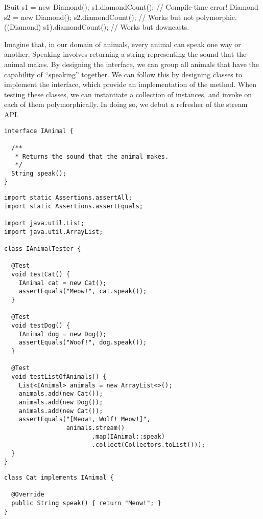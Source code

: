 \begin{verbnobox}[\small]
ISuit s1 = new Diamond();
s1.diamondCount();             // Compile-time error!
Diamond s2 = new Diamond();
s2.diamondCount();             // Works but not polymorphic.
((Diamond) s1).diamondCount(); // Works but downcasts.
\end{verbnobox}

Imagine that, in our domain of animals, every animal can speak one way or another. 
Speaking involves returning a string representing the sound that the animal makes. 
By designing the  interface, we can group all animals that have the capability of ``speaking'' together. 
We can follow this by designing classes to implement the  interface, which provide an implementation of the  method. 
When testing these classes, we can instantiate a collection of  instances, and invoke  on each of them polymorphically. 
In doing so, we debut a refresher of the stream API.

\begin{lstlisting}[language=MyJava]
interface IAnimal {

  /**
   * Returns the sound that the animal makes.
   */
  String speak();
}
\end{lstlisting}

\begin{lstlisting}[language=MyJava]
import static Assertions.assertAll;
import static Assertions.assertEquals;

import java.util.List;
import java.util.ArrayList;

class IAnimalTester {
  
  @Test
  void testCat() {
    IAnimal cat = new Cat();
    assertEquals("Meow!", cat.speak());
  }

  @Test
  void testDog() {
    IAnimal dog = new Dog();
    assertEquals("Woof!", dog.speak());
  }

  @Test
  void testListOfAnimals() {
    List<IAnimal> animals = new ArrayList<>();
    animals.add(new Cat());
    animals.add(new Dog());
    animals.add(new Cat());
    assertEquals("[Meow!, Wolf! Meow!]", 
                 animals.stream()
                        .map(IAnimal::speak)
                        .collect(Collectors.toList()));
  }
}
\end{lstlisting}

\begin{lstlisting}[language=MyJava]
class Cat implements IAnimal {

  @Override
  public String speak() { return "Meow!"; }
}
\end{lstlisting}

